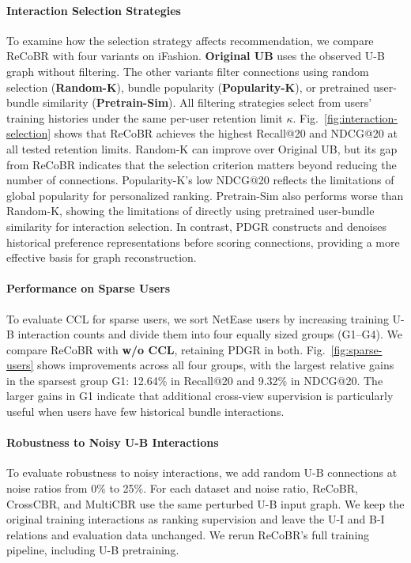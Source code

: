 \documentclass[letterpaper,journal]{IEEEtran}
\begin{document}
\paragraph{Interaction Selection Strategies}
To examine how the selection strategy affects recommendation,
we compare ReCoBR with four variants on iFashion.
\textbf{Original UB} uses the observed U-B graph without filtering.
The other variants filter connections using random selection
(\textbf{Random-K}), bundle popularity (\textbf{Popularity-K}),
or pretrained user-bundle similarity (\textbf{Pretrain-Sim}).
All filtering strategies select from users' training histories
under the same per-user retention limit $\kappa$.
Fig.~\ref{fig:interaction-selection} shows that ReCoBR achieves
the highest Recall@20 and NDCG@20 at all tested retention limits.
Random-K can improve over Original UB, but its gap from ReCoBR
indicates that the selection criterion matters beyond reducing
the number of connections. Popularity-K's low NDCG@20 reflects
the limitations of global popularity for personalized ranking.
Pretrain-Sim also performs worse than Random-K, showing the
limitations of directly using pretrained user-bundle similarity
for interaction selection. In contrast, PDGR constructs and
denoises historical preference representations before scoring
connections, providing a more effective basis for graph reconstruction.

\paragraph{Performance on Sparse Users}
To evaluate CCL for sparse users, we sort NetEase users by
increasing training U-B interaction counts and divide them
into four equally sized groups (G1--G4). We compare ReCoBR
with \textbf{w/o CCL}, retaining PDGR in both.
Fig.~\ref{fig:sparse-users} shows improvements across all
four groups, with the largest relative gains in the sparsest
group G1: 12.64\% in Recall@20 and 9.32\% in NDCG@20.
The larger gains in G1 indicate that additional cross-view
supervision is particularly useful when users have few historical
bundle interactions.

\paragraph{Robustness to Noisy U-B Interactions}
To evaluate robustness to noisy interactions, we add random
U-B connections at noise ratios from 0\% to 25\%.
For each dataset and noise ratio, ReCoBR, CrossCBR, and
MultiCBR use the same perturbed U-B input graph.
We keep the original training interactions as ranking supervision
and leave the U-I and B-I relations and evaluation data unchanged.
We rerun ReCoBR's full training pipeline, including U-B pretraining.
\end{document}
